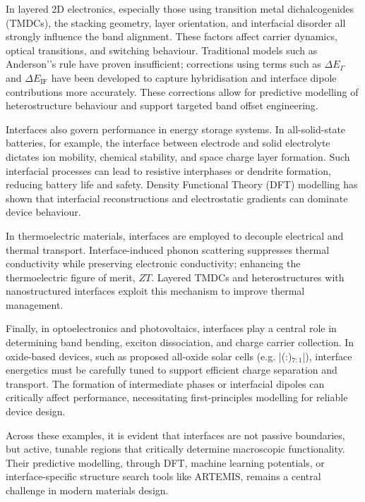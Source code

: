 In layered 2D electronics, especially those using transition metal dichalcogenides (TMDCs), the stacking geometry, layer orientation, and interfacial disorder all strongly influence the band alignment. These factors affect carrier dynamics, optical transitions, and switching behaviour. Traditional models such as Anderson'\rqs's rule have proven insufficient; corrections using terms such as $\Delta E_\Gamma$ and $\Delta E_{\text{IF}}$ have been developed to capture hybridisation and interface dipole contributions more accurately. These corrections allow for predictive modelling of heterostructure behaviour and support targeted band offset engineering.

Interfaces also govern performance in energy storage systems. In all-solid-state batteries, for example, the interface between electrode and solid electrolyte dictates ion mobility, chemical stability, and space charge layer formation. Such interfacial processes can lead to resistive interphases or dendrite formation, reducing battery life and safety. Density Functional Theory (DFT) modelling has shown that interfacial reconstructions and electrostatic gradients can dominate device behaviour.

In thermoelectric materials, interfaces are employed to decouple electrical and thermal transport. Interface-induced phonon scattering suppresses thermal conductivity while preserving electronic conductivity; enhancing the thermoelectric figure of merit, $ZT$. Layered TMDCs and heterostructures with nanostructured interfaces exploit this mechanism to improve thermal management.

Finally, in optoelectronics and photovoltaics, interfaces play a central role in determining band bending, exciton dissociation, and charge carrier collection. In oxide-based devices, such as proposed all-oxide solar cells (e.g. |(:)$_{7:1}$|), interface energetics must be carefully tuned to support efficient charge separation and transport. The formation of intermediate phases or interfacial dipoles can critically affect performance, necessitating first-principles modelling for reliable device design. 

Across these examples, it is evident that interfaces are not passive boundaries, but active, tunable regions that critically determine macroscopic functionality. Their predictive modelling, through DFT, machine learning potentials, or interface-specific structure search tools like ARTEMIS, remains a central challenge in modern materials design.